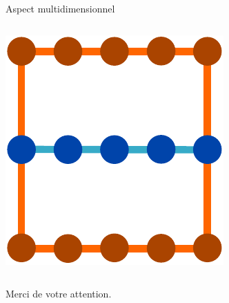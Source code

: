 \documentclass[xcolor=x11names,compress]{beamer}
\renewcommand{\(}{\begin{columns}} \renewcommand{\)}{\end{columns}}
\newcommand{\<}[1]{\begin{column}{#1}} \renewcommand{\>}{\end{column}}
\begin{document}
\begin{frame}{Aspect multidimensionnel}
\begin{columns}[t]
\begin{column}{0.3\textwidth}
      \includegraphics[scale=0.4]{OutilCourbe10}
    \end{column}
  \end{columns}
\end{frame}

\begin{frame}{}
\begin{center}
\huge Merci de votre attention.
\end{center}
\end{frame}

\appendix
\end{document}

